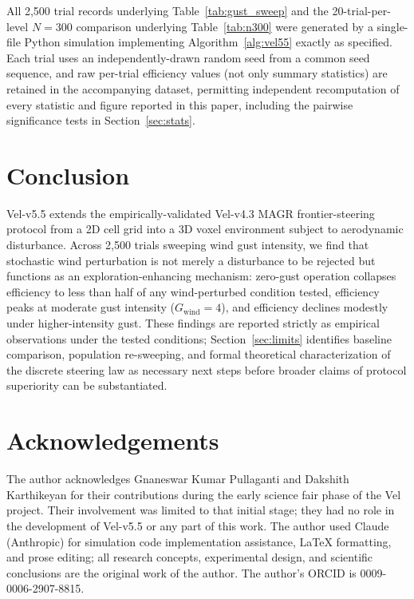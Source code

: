 \documentclass[10pt,journal]{IEEEtran}
\begin{document}
All 2{,}500 trial records underlying Table~\ref{tab:gust_sweep} and the
20-trial-per-level $N=300$ comparison underlying Table~\ref{tab:n300} were
generated by a single-file Python simulation implementing
Algorithm~\ref{alg:vel55} exactly as specified. Each trial uses an
independently-drawn random seed from a common seed sequence, and raw
per-trial efficiency values (not only summary statistics) are retained in
the accompanying dataset, permitting independent recomputation of every
statistic and figure reported in this paper, including the pairwise
significance tests in Section~\ref{sec:stats}.

\section{Conclusion}
\label{sec:conclusion}

Vel-v5.5 extends the empirically-validated Vel-v4.3 MAGR frontier-steering
protocol from a 2D cell grid into a 3D voxel environment subject to
aerodynamic disturbance. Across 2{,}500 trials sweeping wind gust
intensity, we find that stochastic wind perturbation is not merely a
disturbance to be rejected but functions as an exploration-enhancing
mechanism: zero-gust operation collapses efficiency to less than half of
any wind-perturbed condition tested, efficiency peaks at moderate gust
intensity ($G_{\text{wind}}=4$), and efficiency declines modestly under
higher-intensity gust. These findings are reported strictly as empirical
observations under the tested conditions; Section~\ref{sec:limits}
identifies baseline comparison, population re-sweeping, and formal
theoretical characterization of the discrete steering law as necessary next
steps before broader claims of protocol superiority can be substantiated.

\section*{Acknowledgements}
The author acknowledges Gnaneswar Kumar Pullaganti and Dakshith Karthikeyan
for their contributions during the early science fair phase of the Vel
project. Their involvement was limited to that initial stage; they had no
role in the development of Vel-v5.5 or any part of this work. The author
used Claude (Anthropic) for simulation code implementation assistance,
LaTeX formatting, and prose editing; all research concepts, experimental
design, and scientific conclusions are the original work of the author.
The author's ORCID is 0009-0006-2907-8815.
\end{document}
